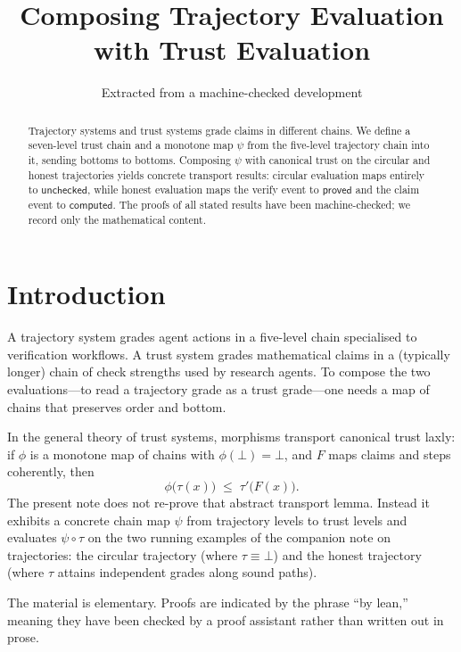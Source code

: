 \documentclass[11pt,a4paper]{article}
\title{Composing Trajectory Evaluation with Trust Evaluation}
\author{Extracted from a machine-checked development}
\date{}
\theoremstyle{plain}
\theoremstyle{definition}
\newcommand{\tauu}{\tau}
\begin{document}
\maketitle

\begin{abstract}
Trajectory systems and trust systems grade claims in different chains. We
define a seven-level trust chain and a monotone map $\psi$ from the
five-level trajectory chain into it, sending bottoms to bottoms. Composing
$\psi$ with canonical trust on the circular and honest trajectories yields
concrete transport results: circular evaluation maps entirely to
$\mathsf{unchecked}$, while honest evaluation maps the verify event to
$\mathsf{proved}$ and the claim event to $\mathsf{computed}$. The proofs of
all stated results have been machine-checked; we record only the mathematical
content.
\end{abstract}

\tableofcontents
\bigskip

\section{Introduction}

A trajectory system grades agent actions in a five-level chain specialised
to verification workflows. A trust system grades mathematical claims in a
(typically longer) chain of check strengths used by research agents. To
compose the two evaluations---to read a trajectory grade as a trust
grade---one needs a map of chains that preserves order and bottom.

In the general theory of trust systems, morphisms transport canonical trust
laxly: if $\phi$ is a monotone map of chains with $\phi(\bot) = \bot$, and
$F$ maps claims and steps coherently, then
\begin{equation}
  \phi\bigl(\tauu(x)\bigr) \;\le\; \tauu'\bigl(F(x)\bigr).
\end{equation}
The present note does not re-prove that abstract transport lemma. Instead it
exhibits a concrete chain map $\psi$ from trajectory levels to trust levels
and evaluates $\psi \circ \tauu$ on the two running examples of the companion
note on trajectories: the circular trajectory (where $\tauu \equiv \bot$)
and the honest trajectory (where $\tauu$ attains independent grades along
sound paths).

The material is elementary. Proofs are indicated by the phrase ``by lean,''
meaning they have been checked by a proof assistant rather than written out
in prose.
\end{document}
